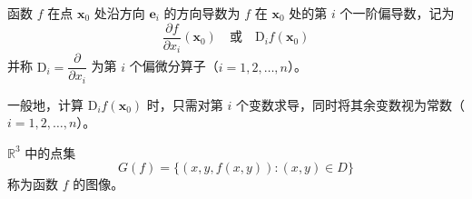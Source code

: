 \begin{definition}
  函数 $f$ 在点 $\bm{x}_0$ 处沿方向 $\bm{e}_i$ 的方向导数为 $f$ 在 $\bm{x}_0$ 处的第 $i$ 个一阶偏导数，记为
  \[
      \frac{\partial f}{\partial x_i}(\bm{x}_0) \quad \text{或} \quad \mathrm{D}_{i}f(\bm{x}_0)
  \]
  并称 $\mathrm{D}_i = \dfrac{\partial}{\partial x_i}$ 为第 $i$ 个偏微分算子（$i = 1, 2, \ldots, n$）。
\end{definition}

\begin{remark}
  一般地，计算 $\mathrm{D}_{i}f(\bm{x}_0)$ 时，只需对第 $i$ 个变数求导，同时将其余变数视为常数（$i = 1, 2, \ldots, n$）。
\end{remark}

\begin{definition}
  $\mathbb{R}^3$ 中的点集
  \[
      G(f) = \{(x, y, f(x, y)): (x, y) \in D\}
  \]
  称为函数 $f$ 的图像。
\end{definition}




\section{}







\section{}







\section{}







\section{}







